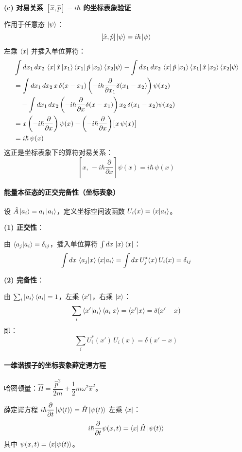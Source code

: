 \documentclass[12pt,a4paper]{article}
\begin{document}
\textbf{(c) 对易关系 $[\hat{x},\hat{p}]=i\hbar$ 的坐标表象验证}

作用于任意态 $\ket{\psi}$：
\[
[\hat{x},\hat{p}]\ket{\psi}=i\hbar\ket{\psi}
\]
左乘 $\bra{x}$ 并插入单位算符：
\begin{align*}
&\int dx_1\,dx_2\,\bra{x}\hat{x}\ket{x_1}\bra{x_1}\hat{p}\ket{x_2}\braket{x_2|\psi}-\int dx_1\,dx_2\,\bra{x}\hat{p}\ket{x_1}\bra{x_1}\hat{x}\ket{x_2}\braket{x_2|\psi}\\
&=\int dx_1\,dx_2\,x\,\delta(x-x_1)\left(-i\hbar\frac{\partial}{\partial x_1}\delta(x_1-x_2)\right)\psi(x_2)\\
&\quad-\int dx_1\,dx_2\left(-i\hbar\frac{\partial}{\partial x}\delta(x-x_1)\right)x_2\,\delta(x_1-x_2)\psi(x_2)\\
&=x\left(-i\hbar\frac{\partial}{\partial x}\right)\psi(x)-\left(-i\hbar\frac{\partial}{\partial x}\right)\!\big[x\,\psi(x)\big]\\
&=i\hbar\,\psi(x)
\end{align*}
这正是坐标表象下的算符对易关系：
\[
\left[x,\,-i\hbar\frac{\partial}{\partial x}\right]\psi(x)=i\hbar\,\psi(x)
\]

\paragraph{能量本征态的正交完备性（坐标表象）}

设 $\hat{A}\ket{a_i}=a_i\ket{a_i}$，定义坐标空间波函数 $U_i(x)=\braket{x|a_i}$。

\textbf{(1) 正交性}：

由 $\braket{a_j|a_i}=\delta_{ij}$，插入单位算符 $\int dx\,\ket{x}\bra{x}$：
\[
\int dx\,\braket{a_j|x}\braket{x|a_i}=\int dx\,U_j^*(x)\,U_i(x)=\delta_{ij}
\]

\textbf{(2) 完备性}：

由 $\sum_i\ket{a_i}\bra{a_i}=1$，左乘 $\bra{x'}$，右乘 $\ket{x}$：
\[
\sum_i\braket{x'|a_i}\braket{a_i|x}=\braket{x'|x}=\delta(x'-x)
\]
即：
\[
\sum_i U_i^*(x')\,U_i(x)=\delta(x'-x)
\]

\paragraph{一维谐振子的坐标表象薛定谔方程}

哈密顿量：$\hat{H}=\dfrac{\hat{p}^2}{2m}+\dfrac{1}{2}m\omega^2\hat{x}^2$。

薛定谔方程 $i\hbar\dfrac{\partial}{\partial t}\ket{\psi(t)}=\hat{H}\ket{\psi(t)}$ 左乘 $\bra{x}$：
\[
i\hbar\frac{\partial}{\partial t}\psi(x,t)=\bra{x}\hat{H}\ket{\psi(t)}
\]
其中 $\psi(x,t)=\braket{x|\psi(t)}$。
\end{document}
